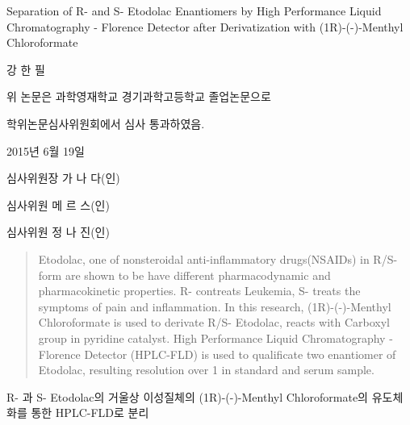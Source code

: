 \documentclass[12pt]{article} %
\begin{document}
\begin{center}
	\LARGE Separation of R- and S- Etodolac Enantiomers by High Performance Liquid Chromatography - Florence Detector after Derivatization with (1R)-(-)-Menthyl Chloroformate
	
	\vskip12mm
	\Large
	강 한 필
	
	\vskip12mm
	
	위 논문은 과학영재학교 경기과학고등학교 졸업논문으로
	
	학위논문심사위원회에서 심사 통과하였음.
\end{center}
\begin{flushright}	
	\Large
	\vskip48mm
	
	2015년 6월 19일
	
	\bigskip
	
	심사위원장 가 나 다(인)
	
	심사위원 메 르 스(인)
	
	심사위원 정 나 진(인)
\end{flushright}
\pagebreak
	




\setcounter{page}{1}

\maketitle

\begin{abstract}
Etodolac, one of nonsteroidal anti-inflammatory drugs(NSAIDs) in R/S- form are shown to be have different pharmacodynamic and pharmacokinetic properties. R- contreats Leukemia, S- treats the symptoms of pain and inflammation. In this research, (1R)-(-)-Menthyl Chloroformate is used to derivate R/S- Etodolac, reacts with Carboxyl group in pyridine catalyst. High Performance Liquid Chromatography - Florence Detector (HPLC-FLD) is used to qualificate two enantiomer of Etodolac, resulting resolution over 1 in standard and serum sample.  
\end{abstract}

\newpage

\begin{center}

	\vskip24mm
	
	\LARGE R- 과 S- Etodolac의 거울상 이성질체의 (1R)-(-)-Menthyl Chloroformate의 유도체화를 통한 HPLC-FLD로 분리
	
	\bigskip

\end{center}
\end{document}
